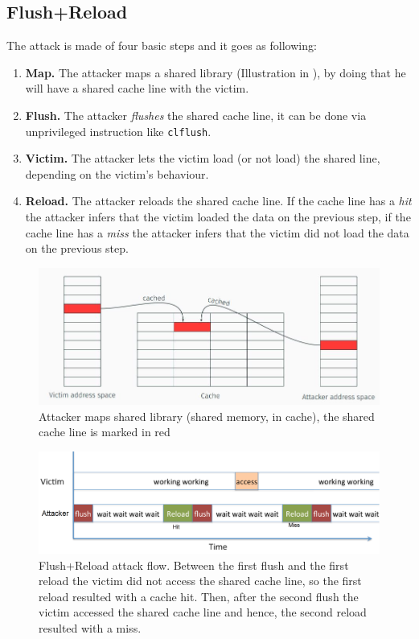 \subsection{Flush+Reload}
\label{subsec:flushreload}
The attack is made of four basic steps and it goes as following:
\begin{enumerate}
    \item \textbf{Map.} The attacker maps a shared library (Illustration in
    ), by doing that he will have a shared cache line
    with the victim.
    \item \textbf{Flush.} The attacker \textit{flushes} the shared cache line,
    it can be done via unprivileged instruction like \texttt{clflush}.
    \item \textbf{Victim.} The attacker lets the victim load (or not load) the
    shared line, depending on the victim's behaviour.
    \item \textbf{Reload.} The attacker reloads the shared cache line. If the
    cache line has a \textit{hit} the attacker infers that the victim loaded the
    data on the previous step, if the cache line has a \textit{miss} the
    attacker infers that the victim did not load the data on the previous step.
\end{enumerate}

\begin{figure}[!ht]
    \centering
    \includegraphics[width=\textwidth]{images/chapter_6/fr_sharedlib.JPG}
    \caption{Attacker maps shared library (shared memory, in cache), the shared cache line is marked in red}
    \label{fig:fr_sharedlib}
\end{figure}

\begin{figure}[!ht]
    \centering
    \includegraphics[width=\textwidth]{images/chapter_6/fr_flow.png}
    \caption{Flush+Reload attack flow. Between the first flush and the first reload the victim did not access the shared cache line, so the first reload resulted with a cache hit. Then, after the second flush the victim accessed the shared cache line and hence, the second reload resulted with a miss.}
    \label{fig:fr_flow}
\end{figure}

